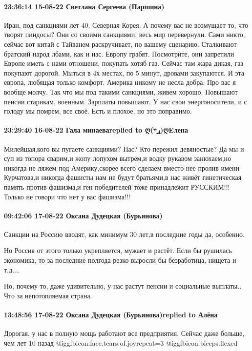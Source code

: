  
 
 
 
 

\paragraph{23:36:14 15-08-22 Светлана Сергеева (Паршина)}

Иран, под санкциями лет 40. Северная Корея. А почему вас не возмущает то, что
творят пиндосы? Они со своими санкциями, весь мир перевернули. Сами никто,
сейчас вот китай с Тайванем раскручивает, по вашему сценарию. Сталкивают
братский народ лбами, как и нас. Европу грабят. Посмотрите, они запретили
Европе иметь с нами отношени, покупать хотяб газ. Сейчас там жара дикая, газ
покупают дорогой. Мыться в 4х местах, по 5 минут, дровами закупаются. И эта
европа, любящая только комфорт. Америка никому не несла добра. Про вас я вообще
молчу. Так что мы под такими санкциями, живем хорошо. Повышают пенсии старикам,
военным. Зарплаты повышают. У нас свои энергоносители, и с голоду мы помрем,
все своё. Есть и плохое, но это поправимо.

\paragraph{23:29:40 16-08-22 Гала минаеваreplied to ღ(ړײ)ღEлена}

Милейшая,кого вы пугаете санкциями? Нас? Кто пережил девяностые? Да мы и суп из
топора сварим,и жопу лопухом вытрем,и водку рукавом занюхаем,но никогда не
ляжем под Америку,скорее всего сделаем вместо нее пролив имени Курчатова,и
никогда фашисты нам не будут братьями,в нас живёт гинетическая память против
фашизма,и ген победителей тоже принадлежит РУССКИМ!!! Только не говори что нет
у вас фашизма!!!

\paragraph{09:42:06 17-08-22 Оксана Дудецкая (Бурьянова)}

Санкции на Россию вводят, как минимум 30 лет,в последние годы да, особенно.

Но Россия от этого только укрепляется, мужает и растёт. Если бы рушилась
экономика, то за последние полгода резко выросли бы безработица, нищета и
т.д....

Но, почему то, даже удивительно, у нас растут пенсии и социальные выплаты.. Что
за непотопляемая страна.

\paragraph{13:48:56 17-08-22 Оксана Дудецкая (Бурьянова)replied to Алёна}

Дорогая, у нас в полную мощь работают все предприятия. Сейчас даже больше, чем
лет 10 назад  @igg{fbicon.face.tears.of.joy}{repeat=3}  @igg{fbicon.biceps.flexed} 
